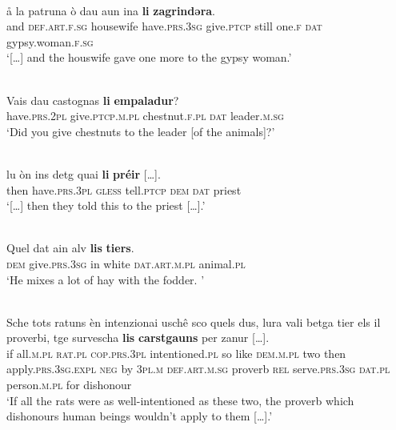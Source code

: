 \ea\label{}
\\
\gll […] å la patruna ò dau aun ina \textbf{li} \textbf{zagrindǝra}.\\
    [...] and \textsc{def.art.f.sg} housewife have.\textsc{prs.3sg} give.\textsc{ptcp} still one.\textsc{f} \textsc{dat} gypsy.woman.\textsc{f.sg}\\
\glt `[…] and the houswife gave one more to the gypsy woman.'
\z

\ea\label{}
\\
\gll Vais dau castognas \textbf{li} \textbf{empaladur}?   \\
     have.\textsc{prs.2pl} give.\textsc{ptcp.m.pl} chestnut.\textsc{f.pl} \textsc{dat} leader.\textsc{m.sg} \\
\glt `Did you give chestnuts to the leader [of the animals]?'
\z



\ea\label{}
\\
\gll […] lu òn ins detg quai \textbf{li} \textbf{préir} […].\\
[…] then have.\textsc{prs.3pl} \textsc{gless} tell.\textsc{ptcp} \textsc{dem} \textsc{dat} priest\\
\glt `[…] then they told this to the priest […].'
\z

\ea\label{ex:1:}
\\
\gll  Quel dat ain alv \textbf{lis} \textbf{tiers}. \\
    \textsc{dem} give.\textsc{prs.3sg} in white \textsc{dat.art.m.pl} animal.\textsc{pl} \\
\glt `He mixes a lot of hay with the fodder. '
\z


 \ea\label{}
\\
\gll Sche tots ratuns èn intenzionai uschê sco quels dus, lura vali betga tier els il proverbi, tge survescha \textbf{lis} \textbf{carstgauns} per zanur […].\\
    if all.\textsc{m.pl} \textsc{rat.pl} \textsc{cop.prs.3pl} intentioned.\textsc{pl} so like \textsc{dem.m.pl} two then apply.\textsc{prs.3sg.expl} \textsc{neg} by \textsc{3pl.m} \textsc{def.art.m.sg} proverb \textsc{rel} serve.\textsc{prs.3sg} \textsc{dat.pl} person.\textsc{m.pl} for dishonour\\
\glt `If all the rats were as well-intentioned as these two, the proverb which dishonours human beings wouldn’t apply to them […].'
\z

